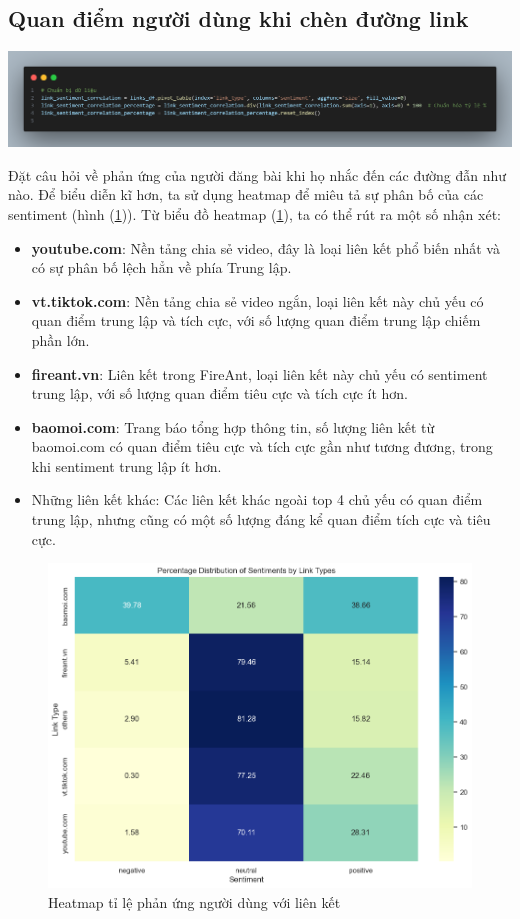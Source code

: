 \subsection{Quan điểm người dùng khi chèn đường link}

\begin{center}
\includegraphics[width=0.9\linewidth]{images/code-2.17.png}
\end{center}

Đặt câu hỏi về phản ứng của người đăng bài khi họ nhắc đến các đường đẫn như nào. Để biểu diễn kĩ hơn, ta sử dụng heatmap để miêu tả sự phân bố của các sentiment (hình (\ref{fig:2.6})). Từ biểu đồ heatmap (\ref{fig:2.6}), ta có thể rút ra một số nhận xét:

\begin{itemize}
    \item \textbf{youtube.com}: Nền tảng chia sẻ video, đây là loại liên kết phổ biến nhất và có sự phân bố lệch hẳn về phía Trung lập. 
    \item \textbf{vt.tiktok.com}: Nền tảng chia sẻ video ngắn, loại liên kết này chủ yếu có quan điểm trung lập và tích cực, với số lượng quan điểm trung lập chiếm phần lớn.
    \item \textbf{fireant.vn}: Liên kết trong FireAnt, loại liên kết này chủ yếu có sentiment trung lập, với số lượng quan điểm tiêu cực và tích cực ít hơn.
    \item \textbf{baomoi.com}: Trang báo tổng hợp thông tin, số lượng liên kết từ baomoi.com có quan điểm tiêu cực và tích cực gần như tương đương, trong khi sentiment trung lập ít hơn.
    \item Những liên kết khác: Các liên kết khác ngoài top 4 chủ yếu có quan điểm trung lập, nhưng cũng có một số lượng đáng kể quan điểm tích cực và tiêu cực.

\end{itemize}

\begin{figure}[h]
    \centering
    \includegraphics[width=0.85\linewidth]{images/plot-2.4-heatmap.png}
    \caption{Heatmap tỉ lệ phản ứng người dùng với liên kết}
    \label{fig:2.6}
\end{figure}

